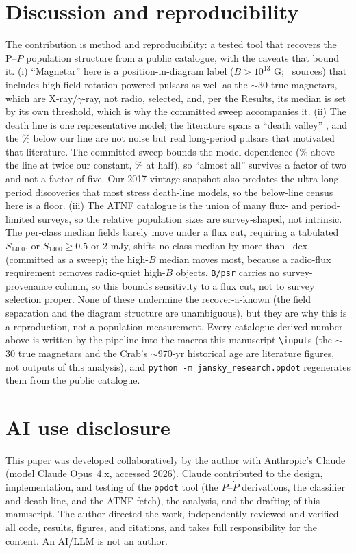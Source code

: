 \documentclass[twocolumn]{aastex631}
\newcommand{\code}[1]{\texttt{#1}}
\begin{document}
\section{Discussion and reproducibility}
The contribution is method and reproducibility: a tested tool that recovers the P--$\dot P$ population
structure from a public catalogue, with the caveats that bound it. (i) ``Magnetar'' here is a
position-in-diagram label ($B>10^{13}$ G; \ppNmagnetar\ sources) that includes high-field
rotation-powered pulsars as well as the $\sim$30 true magnetars, which are X-ray/$\gamma$-ray, not radio, selected, and, per the Results, its median is set by its own threshold, which is why the
committed sweep accompanies it. (ii) The death line is one representative model; the literature
spans a ``death valley'' \citep{chenruderman1993}, and the \ppFracDead\% below our line are not
noise but real long-period pulsars that motivated that literature. The committed sweep bounds the model dependence (\ppFracAlivePctLo\% above the line at twice our constant, \ppFracAlivePctHi\% at half), so ``almost all'' survives a factor of two and not a factor of five. Our 2017-vintage
snapshot also predates the ultra-long-period discoveries that most stress death-line models, so
the below-line census here is a floor. (iii) The ATNF catalogue is the union of many flux- and
period-limited surveys, so the relative population sizes are survey-shaped, not intrinsic. The per-class median fields barely move under a flux cut, requiring a tabulated $S_{1400}$, or $S_{1400}\geq0.5$ or 2 mJy, shifts no class median by more than \ppFluxCutMaxDex\ dex (committed
as a sweep); the high-$B$ median moves most, because a radio-flux requirement removes radio-quiet
high-$B$ objects. \code{B/psr} carries no survey-provenance column, so this bounds sensitivity to
a flux cut, not to survey selection proper. None of these undermine the recover-a-known (the
field separation and the diagram structure are unambiguous), but they are why this is a
reproduction, not a population measurement. Every catalogue-derived number above is written by the pipeline into the macros
this manuscript \code{\textbackslash input}s (the $\sim$30 true magnetars and the Crab's $\sim$970-yr
historical age are literature figures, not outputs of this analysis), and \code{python -m jansky\_research.ppdot} regenerates them from the
public catalogue.

\section*{AI use disclosure}
This paper was developed collaboratively by the author with Anthropic's Claude
\citep{anthropicclaude} (model Claude Opus~4.x, accessed 2026). Claude contributed to the design,
implementation, and testing of the \code{ppdot} tool (the $P$--$\dot P$ derivations, the classifier and
death line, and the ATNF fetch), the analysis, and the drafting of this manuscript. The author directed
the work, independently reviewed and verified all code, results, figures, and citations, and takes full
responsibility for the content. An AI/LLM is not an author.
\end{document}
